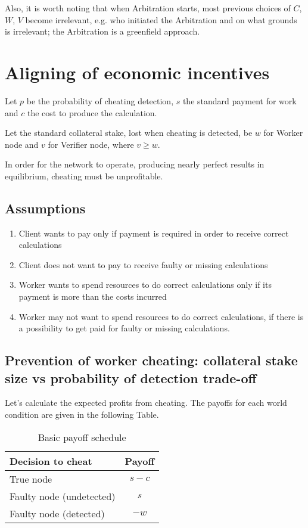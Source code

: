 \documentclass[conference]{IEEEtran}
\begin{document}
Also, it is worth noting that when Arbitration starts, most previous choices of $C$, $W$, $V$ become irrelevant, e.g. who initiated the Arbitration and on what grounds is irrelevant; the Arbitration is a greenfield approach.

\section{Aligning of economic incentives}

Let $p$ be the probability of cheating detection, $s$ the standard payment for work and $c$ the cost to produce the calculation.

Let the standard collateral stake, lost when cheating is detected, be $w$ for Worker node and $v$ for Verifier node, where $v \geq w$.

In order for the network to operate, producing nearly perfect results in equilibrium, cheating must be unprofitable.

\subsection{Assumptions}

\begin{enumerate}
    \item 
        Client wants to pay only if payment is required in order to receive correct calculations
    \item 
        Client does not want to pay to receive faulty or missing calculations
    \item 
        Worker wants to spend resources to do correct calculations only if its payment is more than the costs incurred
    \item 
        Worker may not want to spend resources to do correct calculations, if there is a possibility to get paid for faulty or missing calculations.
\end{enumerate}

\subsection{Prevention of worker cheating: collateral stake size vs probability of detection trade-off}

Let's calculate the expected profits from cheating. The payoffs for each world condition are given in the following Table.

\begin{table}[ht]
    \caption{Basic payoff schedule}
    \label{table:basicpayoff}
    \begin{adjustbox}{center}
        \begin{tabular}{l c}
            \toprule
            Decision to cheat & Payoff \\
            \midrule
            True node & $s-c$ \\
            Faulty node (undetected) & $s$ \\
            Faulty node (detected) & $-w$ \\
            \bottomrule
        \end{tabular}
    \end{adjustbox}
\end{table}
\end{document}
